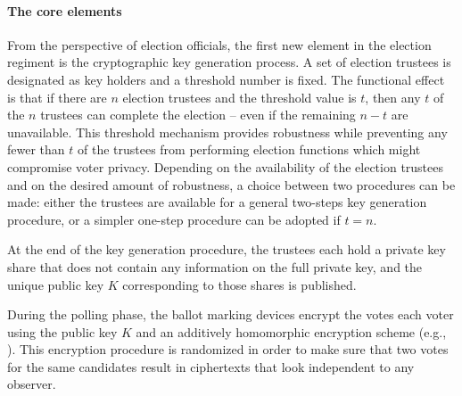 \label{sec:crypto}



\paragraph{The core elements}
\label{sec:crypto-core}

From the perspective of election officials, the first new element in
the election regiment is the cryptographic key generation process. A
set of election trustees is designated as key holders and a threshold
number is fixed. The functional effect is that if there are $n$
election trustees and the threshold value is $t$, then any $t$ of the
$n$ trustees can complete the election – even if the remaining $n-t$
are unavailable. This threshold mechanism provides robustness while
preventing any fewer than $t$ of the trustees from performing election
functions which might compromise voter privacy. Depending on the
availability of the election trustees and on the desired amount of
robustness, a choice between two procedures can be made: either the
trustees are available for a general two-steps key generation
procedure, or a simpler one-step procedure can be adopted if $t=n$.

At the end of the key generation procedure, the trustees each hold a
private key share that does not contain any information on the full
private key, and the unique public key $K$ corresponding to those
shares is published.

During the polling phase, the ballot marking devices encrypt the votes
each voter using the public key $K$ and an additively homomorphic
encryption scheme (e.g., \elgamal). This encryption procedure is
randomized in order to make sure that two votes for the same
candidates result in ciphertexts that look independent to any
observer. 

